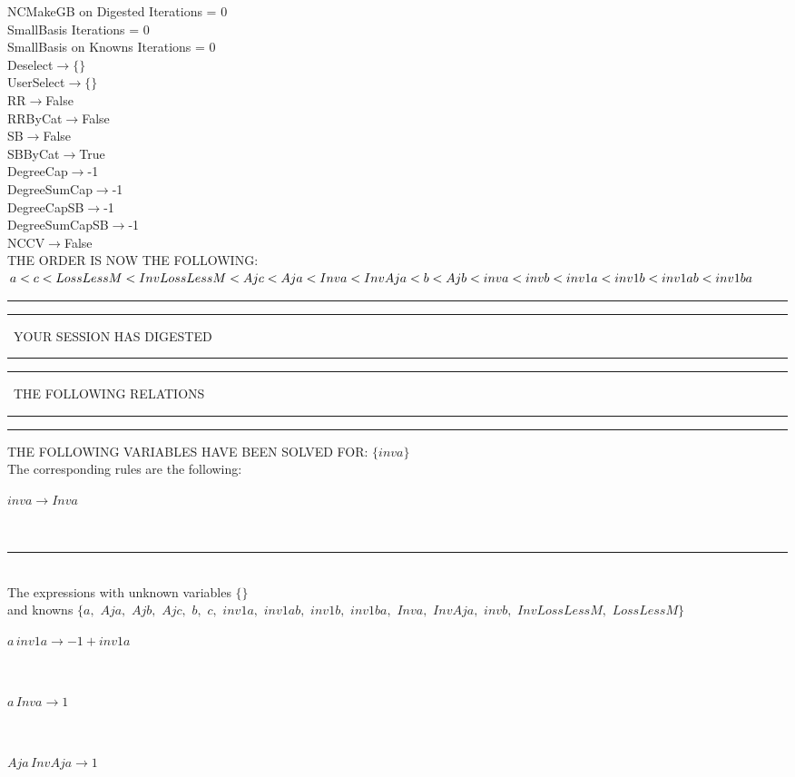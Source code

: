 NCMakeGB on Digested Iterations = 0\\
SmallBasis Iterations = 0\\
SmallBasis on Knowns Iterations = 0\\
Deselect$\rightarrow \{\}$\\
UserSelect$\rightarrow \{\}$\\
RR$\rightarrow $False\\
RRByCat$\rightarrow $False\\
SB$\rightarrow $False\\
SBByCat$\rightarrow $True\\
DegreeCap$\rightarrow $-1\\
DegreeSumCap$\rightarrow $-1\\
DegreeCapSB$\rightarrow $-1\\
DegreeSumCapSB$\rightarrow $-1\\
NCCV$\rightarrow $False\\
THE ORDER IS NOW THE FOLLOWING:\hfil\break
$
a<c<LossLessM<InvLossLessM<Ajc<Aja<Inva<InvAja<b<Ajb<inva<invb<inv1a<inv1b<inv1ab<inv1ba\\
$
\rule[2pt]{6in}{4pt}\hfil\break
\rule[2pt]{1.879in}{4pt}
\ YOUR SESSION HAS DIGESTED\ 
\rule[2pt]{1.879in}{4pt}\hfil\break
\rule[2pt]{1.923in}{4pt}
\ THE FOLLOWING RELATIONS\ 
\rule[2pt]{1.923in}{4pt}\hfil\break
\rule[2pt]{6in}{4pt}\hfil\break
THE FOLLOWING VARIABLES HAVE BEEN SOLVED FOR:\hfil\break
$\{inva\}$
\smallskip\\
The corresponding rules are the following:\smallskip\\
\begin{minipage}{6in}
$
inva\rightarrow Inva
$
\end{minipage}\medskip\\
\rule[3pt]{6in}{.7pt}\\
The expressions with unknown variables $\{\}$\\
and knowns $\{a,
$ $
Aja,
$ $
Ajb,
$ $
Ajc,
$ $
b,
$ $
c,
$ $
inv1a,
$ $
inv1ab,
$ $
inv1b,
$ $
inv1ba,
$ $
Inva,
$ $
InvAja,
$ $
invb,
$ $
InvLossLessM,
$ $
LossLessM\}$\smallskip\\
\begin{minipage}{6in}
$
a\,
 inv1a\rightarrow -1 + inv1a
$
\end{minipage}\medskip \\
\begin{minipage}{6in}
$
a\,
 Inva\rightarrow 1
$
\end{minipage}\medskip \\
\begin{minipage}{6in}
$
Aja\,
 InvAja\rightarrow 1
$
\end{minipage}\medskip \\
